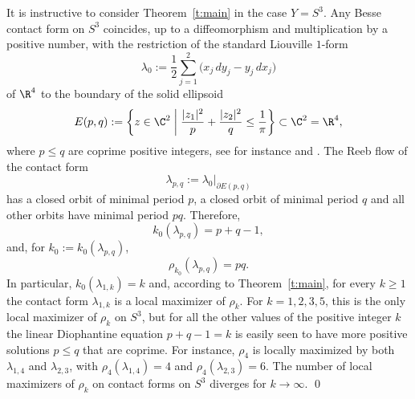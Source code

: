 \begin{exm}
It is instructive to consider Theorem~\ref{t:main} in the case $Y=S^3$. Any Besse contact form on $S^3$ coincides, up to a diffeomorphism and multiplication by a positive number, with the restriction of the standard Liouville $1$-form
\[
\lambda_0:= \frac{1}{2} \sum_{j=1}^2 \big(x_j \, dy_j - y_j \, dx_j \big)
\]
of $\R^4$ to the boundary of the solid ellipsoid
\[
E(p,q):= \biggl\{ z\in \C^2 \biggm| \frac{ |z_1|^2}{p} + \frac{ |z_2|^2}{q} \leq \frac1\pi \biggr\} \subset \C^2 = \R^4,
\]
where $p\leq q$ are coprime positive integers, see for instance \cite[Prop.\,5.2]{Geiges:2018aa} and \cite[Th.\,1.1]{Mazzucchelli:2020aa}. The Reeb flow of the contact form
\[
\lambda_{p,q}:= \lambda_0|_{\partial E(p,q)}
\]
has a closed orbit of minimal period $p$, a closed orbit of minimal period $q$ and all other orbits have minimal period $pq$. Therefore,
\[
k_0(\lambda_{p,q}) = p + q - 1,
\]
and, for $k_0:= k_0(\lambda_{p,q})$,
\[
\rho_{k_0} (\lambda_{p,q}) = pq .
\]
In particular, $k_0(\lambda_{1,k}) = k$ and, according to Theorem~\ref{t:main}, for every $k\geq 1$ the contact form $\lambda_{1,k}$ is a local maximizer of $\rho_k$. For $k=1,2,3,5$, this is the only local maximizer of $\rho_k$ on $S^3$, but for all the other values of the positive integer $k$ the linear Diophantine equation $ p + q - 1 = k$ is easily seen to have more positive solutions $p\leq q$ that are coprime. For instance, $\rho_4$ is locally maximized by both $\lambda_{1,4}$ and $\lambda_{2,3}$, with $\rho_4(\lambda_{1,4})=4$ and $\rho_4(\lambda_{2,3})=6$. The number of local maximizers of $\rho_k$ on contact forms on $S^3$ diverges for $k\to \infty$.
\hfill\qed
\end{exm}

